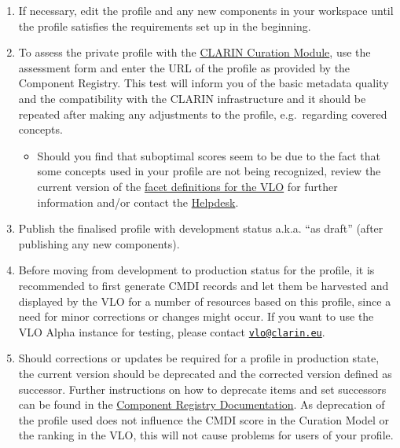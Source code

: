 \begin{enumerate}
\item
  If necessary, edit the profile and any new components in your
  workspace until the profile satisfies the requirements set up in the beginning.

\item
  To assess the private profile with the
  \href{https://clarin.oeaw.ac.at/curate/}{CLARIN Curation Module}, use the assessment form and enter the URL of the profile as provided by the Component Registry. This test will inform you of the basic metadata quality and the compatibility with the CLARIN infrastructure and it should be repeated after making any adjustments to the profile,  e.g.~regarding covered concepts.

\begin{itemize}
\tightlist
\item
  Should you find that suboptimal scores seem to be due to the fact that some concepts used in your profile are not being recognized, review the current version of the
  \href{https://github.com/clarin-eric/VLO/blob/master/vlo-commons/src/main/resources/facetConcepts.xml}{facet
  definitions for the VLO} for further information and/or contact the \href{mailto:vlo@clarin.eu}{Helpdesk}.
\end{itemize}

\item
  Publish the finalised profile with development status a.k.a. ``as draft'' (after publishing any new components).
\item
  Before moving from development to production status for the profile, it is recommended to first generate CMDI records and let them be harvested and displayed by the VLO for a number of resources based on this profile, since a need for minor corrections or changes might occur. If you want to use the VLO Alpha instance for testing, please contact \href{mailto:vlo@clarin.eu}{\nolinkurl{vlo@clarin.eu}}.
\item
  Should corrections or updates be required for a profile in production state, the current version should be deprecated and the corrected version defined as successor. Further instructions on how to deprecate items and set successors can be found in the \href{https://www.clarin.eu/content/component-registry-documentation}{Component Registry Documentation}. As deprecation of the profile used does not influence the CMDI score in the Curation Model or the ranking in the VLO, this will not cause problems for users of your profile.
\end{enumerate}
